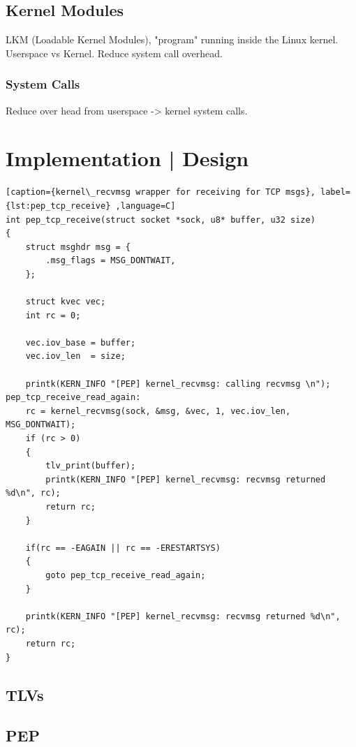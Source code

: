 \documentclass[a4paper,english, 11pt]{report}
\begin{document}
\section{Kernel Modules}
LKM (Loadable Kernel Modules), "program" running inside the Linux kernel.
Userspace vs Kernel. Reduce system call overhead.
\subsection{System Calls}
Reduce over head from userspace -> kernel system calls.

\chapter{Implementation | Design}

\begin{lstlisting}[caption={kernel\_recvmsg wrapper for receiving for TCP msgs}, label={lst:pep_tcp_receive} ,language=C]
int pep_tcp_receive(struct socket *sock, u8* buffer, u32 size)
{
	struct msghdr msg = {
		.msg_flags = MSG_DONTWAIT,
	};

	struct kvec vec;
	int rc = 0;

	vec.iov_base = buffer;
	vec.iov_len  = size;

	printk(KERN_INFO "[PEP] kernel_recvmsg: calling recvmsg \n");
pep_tcp_receive_read_again:
	rc = kernel_recvmsg(sock, &msg, &vec, 1, vec.iov_len, MSG_DONTWAIT);
	if (rc > 0)
	{
		tlv_print(buffer);
		printk(KERN_INFO "[PEP] kernel_recvmsg: recvmsg returned %d\n", rc);
		return rc;
	}

	if(rc == -EAGAIN || rc == -ERESTARTSYS)
	{
		goto pep_tcp_receive_read_again;
	}

	printk(KERN_INFO "[PEP] kernel_recvmsg: recvmsg returned %d\n", rc);
	return rc;
}
\end{lstlisting}

\section{TLVs}

\section{PEP}
\end{document}
